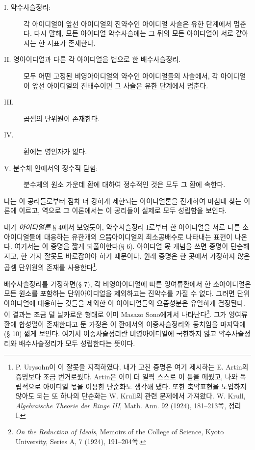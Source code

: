 \begin{description}
\item[I. 약수사슬정리:] 각 아이디얼이 앞선 아이디얼의 진약수인 아이디얼 사슬은 유한 단계에서 멈춘다. 다시 말해, 모든 아이디얼 약수사슬에는 그 뒤의 모든 아이디얼이 서로 같아지는 한 지표가 존재한다.
\item[II. 영아이디얼과 다른 각 아이디얼을 법으로 한 배수사슬정리.] 모두 어떤 고정된 비영아이디얼의 약수인 아이디얼들의 사슬에서, 각 아이디얼이 앞선 아이디얼의 진배수이면 그 사슬은 유한 단계에서 멈춘다.
\item[III.] 곱셈의 단위원이 존재한다.
\item[IV.] 환에는 영인자가 없다.
\item[V. 분수체 안에서의 정수적 닫힘:] 분수체의 원소 가운데 환에 대하여 정수적인 것은 모두 그 환에 속한다.
\end{description}

나는 이 공리들로부터 점차 더 강하게 제한되는 아이디얼론을 전개하여 마침내 찾는 이론에 이르고, 역으로 그 이론에서는 이 공리들이 실제로 모두 성립함을 보인다.

내가 \emph{아이디얼론} § 4에서 보였듯이, 약수사슬정리 I로부터 한 아이디얼을 서로 다른 소아이디얼들에 대응하는 유한개의 으뜸아이디얼의 최소공배수로 나타내는 표현이 나온다. 여기서는 이 증명을 짧게 되풀이한다(§ 6). 아이디얼 몫 개념을 쓰면 증명이 단순해지고, 한 가지 잘못도 바로잡아야 하기 때문이다. 원래 증명은 한 곳에서 가정하지 않은 곱셈 단위원의 존재를 사용한다\footnote{P. Urysohn이 이 잘못을 지적하였다. 내가 고친 증명은 여기 제시하는 E. Artin의 증명보다 조금 번거로웠다. Artin은 이미 더 일찍 스스로 이 틈을 메웠고, 나와 독립적으로 아이디얼 몫을 이용한 단순화도 생각해 냈다. 또한 \glqq{}축약표현\grqq{}을 도입하지 않아도 되는 또 하나의 단순화는 W. Krull의 관련 문제에서 가져왔다. W. Krull, \emph{Algebraische Theorie der Ringe III}, Math. Ann. 92 (1924), 181--213쪽, 정리 I.}.

배수사슬정리를 가정하면(§ 7), 각 비영아이디얼에 따른 잉여류환에서 한 소아이디얼은 모든 원소를 포함하는 단위아이디얼을 제외하고는 진약수를 가질 수 없다. 그러면 단위아이디얼에 대응하는 것들을 제외한 이 아이디얼들의 으뜸성분은 유일하게 결정된다. 이 결과는 조금 덜 날카로운 형태로 이미 Masazo Sono에게서 나타난다\footnote{\emph{On the Reduction of Ideals}, Memoirs of the College of Science, Kyoto University, Series A, 7 (1924), 191--204쪽.}. 그가 잉여류환에 합성열이 존재한다고 둔 가정은 이 환에서의 \glqq{}이중사슬정리\grqq{}와 동치임을 마지막에(§ 10) 짧게 보인다. 여기서 이중사슬정리란 비영아이디얼에 국한하지 않고 약수사슬정리와 배수사슬정리가 모두 성립한다는 뜻이다.

